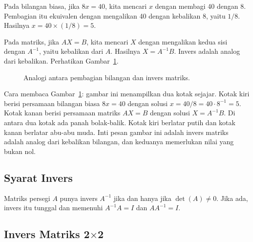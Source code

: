 \documentclass[11pt,a4paper]{article}
\begin{document}
Pada bilangan biasa, jika $8x=40$, kita mencari $x$ dengan membagi 40 dengan 8. Pembagian itu ekuivalen dengan mengalikan 40 dengan kebalikan 8, yaitu $1/8$. Hasilnya $x=40 \times (1/8)=5$.

Pada matriks, jika $AX=B$, kita mencari $X$ dengan mengalikan kedua sisi dengan $A^{-1}$, yaitu kebalikan dari $A$. Hasilnya $X=A^{-1}B$. Invers adalah analog dari kebalikan. Perhatikan Gambar~\ref{fig:analogi-invers}.

\begin{figure}[H]
	\centering
	\caption{Analogi antara pembagian bilangan dan invers matriks.}
	\label{fig:analogi-invers}
\end{figure}

Cara membaca Gambar~\ref{fig:analogi-invers}: gambar ini menampilkan dua kotak sejajar. Kotak kiri berisi persamaan bilangan biasa $8x=40$ dengan solusi $x=40/8=40 \cdot 8^{-1}=5$. Kotak kanan berisi persamaan matriks $AX=B$ dengan solusi $X=A^{-1}B$. Di antara dua kotak ada panah bolak-balik. Kotak kiri berlatar putih dan kotak kanan berlatar abu-abu muda. Inti pesan gambar ini adalah invers matriks adalah analog dari kebalikan bilangan, dan keduanya memerlukan nilai yang bukan nol.

\subsection{Syarat Invers}

Matriks persegi $A$ punya invers $A^{-1}$ jika dan hanya jika $\det(A) \ne 0$. Jika ada, invers itu tunggal dan memenuhi $A^{-1}A=I$ dan $AA^{-1}=I$.

\subsection{Invers Matriks 2$\times$2}
\end{document}
